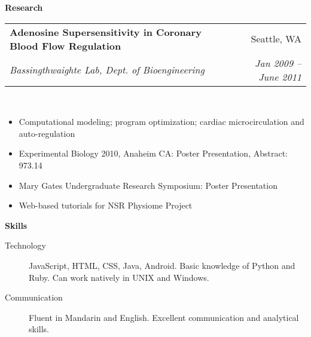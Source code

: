 \documentclass[letterpaper,11pt]{article}
\makeatletter
\newcommand{\resitem}[1]{\item #1 \vspace{-2pt}}
\newcommand{\resheading}[1]{{\large \colorbox{mygrey}{\begin{minipage}{\textwidth}{\textbf{#1 \vphantom{p\^{E}}}}\end{minipage}}}}
\newcommand{\ressubheading}[4]{ %
        \begin{tabular*}{\textwidth}{l@{\extracolsep{\fill}}r}
            \textbf{#1} & #2 \\
                  \textit{#3} & \textit{#4} \\
    \end{tabular*}\vspace{-6pt}}
\newenvironment{section-content}
    {\begin{Sbox}\begin{minipage}{\textwidth}\vspace{0.04in}}
        {\end{minipage}\end{Sbox}\colorbox{white}{\TheSbox}\vspace{0.1in}}
\makeatother
\begin{document}
            \resheading{Research}
            \begin{section-content}
                \ressubheading{{Adenosine Supersensitivity in Coronary Blood Flow Regulation}}{Seattle, WA}{{Bassingthwaighte Lab, Dept. of Bioengineering}}{Jan 2009 -- June 2011}\\
                { \footnotesize
                    \begin{itemize}
                   		\resitem{Computational modeling; program optimization; cardiac microcirculation and auto-regulation}
                            \resitem{Experimental Biology 2010, Anaheim CA: Poster Presentation, Abstract: 973.14}
                            \resitem{Mary Gates Undergraduate Research Symposium: Poster Presentation}
                            \resitem{Web-based tutorials for NSR Physiome Project}
                    \end{itemize}
                }
            \end{section-content}
            \resheading{Skills}
            \begin{section-content}
                \begin{description}
                    \item[Technology] {\footnotesize JavaScript, HTML, CSS, Java, Android. Basic knowledge of Python and Ruby. Can work natively in UNIX and Windows.}
                    \item[Communication]{\footnotesize Fluent in Mandarin and English. Excellent communication and analytical skills. }
                \end{description} %
            \end{section-content}

            
\end{document}
